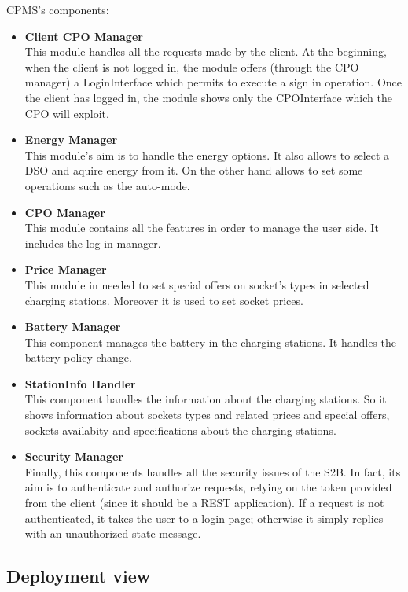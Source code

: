CPMS's components:
\begin{itemize}
    \item \textbf{Client CPO Manager}\\This module handles all the requests made by the client. At the beginning, when the client is not logged in, the module offers (through the CPO manager) a LoginInterface which permits to execute a sign in operation. Once the client has logged in, the module shows only the CPOInterface which the CPO will exploit.
    \item \textbf{Energy Manager}\\This module's aim is to handle the energy options.
    It also allows to select a DSO and aquire energy from it. On the other hand allows to set some operations such as the auto-mode.
    \item \textbf{CPO Manager}\\This module contains all the features in order to manage the user side. It includes the log in manager.
    \item \textbf{Price Manager}\\This module in needed to set special offers on socket's types in selected charging stations. Moreover it is used to set socket prices.
   
    \item \textbf{Battery Manager}\\This component manages the battery in the charging stations. It handles the battery policy change.
    \item \textbf{StationInfo Handler}\\This component handles the information about the charging stations. So it shows information about sockets types and related prices and special offers, sockets availabity and specifications about the charging stations.
 
    \item \textbf{Security Manager}\\Finally, this components handles all the security issues of the S2B. In fact, its aim is to authenticate and authorize requests, relying on the token provided from the client (since it should be a REST application). If a request is not authenticated, it takes the user to a login page; otherwise it simply replies with an unauthorized state message.
\end{itemize}

\subsection{Deployment view}

